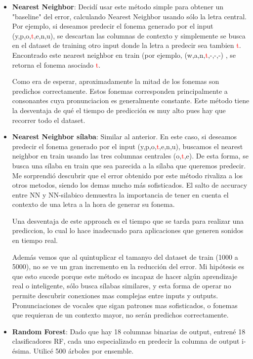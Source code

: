 \documentclass[paper=a4, fontsize=11pt]{scrartcl} %
\numberwithin{equation}{section} %
\numberwithin{figure}{section} %
\numberwithin{table}{section} %
\begin{document}
\begin{itemize}
\item \textbf{Nearest Neighbor}: Decidí usar este método simple para obtener un "baseline" del error, calculando Nearest Neighbor usando sólo la letra central. Por ejemplo, si deseamos predecir el fonema generado por el input (y,p,o,\textcolor{red}{t},e,n,u), se descartan las columnas de contexto y simplemente se busca en el dataset de training otro input donde la letra a predecir sea tambien \textcolor{red}{t}. Encontrado este nearest neighbor en train (por ejemplo, (w,a,n,\textcolor{red}{t},-,-,-) , se retorna el fonema asociado \textcolor{red}{t}.

Como era de esperar, aproximadamente la mitad de los fonemas son predichos correctamente. Estos fonemas corresponden principalmente a consonantes cuya pronunciacion es generalmente constante. Este método tiene la desventaja de qué el tiempo de predicción es muy alto pues hay que recorrer todo el dataset.

\item \textbf{Nearest Neighbor sílaba}: Similar al anterior. En este caso, si deseamos predecir el fonema generado por el input (y,p,o,\textcolor{red}{t},e,n,u), buscamos el nearest neighbor en train usando las tres columnas centrales (o,\textcolor{red}{t},e). De esta forma, se busca una sílaba en train que sea parecida a la sílaba que queremos predecir. Me sorprendió descubrir que el error obtenido por este método rivaliza a los otros metodos, siendo los demas mucho más sofisticados. El salto de accuracy entre NN y NN-silabico demuestra la importancia de tener en cuenta el contexto de una letra a la hora de generar su fonema.

Una desventaja de este approach es el tiempo que se tarda para realizar una prediccion, lo cual lo hace inadecuado para aplicaciones que generen sonidos en tiempo real. 

Además vemos que al quintuplicar el tamanyo del dataset de train (1000 a 5000), no se ve un gran incremento en la reducción del error. Mi hipótesis es que esto sucede porque este método es incapaz de hacer algún aprendizaje real o inteligente, sólo busca sílabas similares, y esta forma de operar no permite descubrir conexiones mas complejas entre inputs y outputs. Pronunciaciones de vocales que sigan patrones mas sofisticados, o fonemas que requieran de un contexto mayor, no serán predichos correctamente.

\item \textbf{Random Forest}: Dado que hay 18 columnas binarias de output, entrené 18 clasificadores RF, cada uno especializado en predecir la columna de output i-ésima. Utilicé 500 árboles por ensemble.


\end{itemize}
\end{document}
